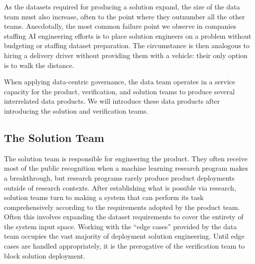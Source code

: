 As the datasets required for producing a solution expand, the size of the data team must also increase, often to the point where they outnumber all the other teams. Anecdotally, the most common failure point we observe in companies staffing AI engineering efforts is to place solution engineers on a problem without budgeting or staffing dataset preparation. The circumstance is then analogous to hiring a delivery driver without providing them with a vehicle: their only option is to walk the distance.

When applying data-centric governance, the data team operates in a service capacity for the product, verification, and solution teams to produce several interrelated data products. We will introduce these data products after introducing the solution and verification teams.

\subsection{The Solution Team}


%
%

The solution team is responsible for engineering the product. They often receive most of the public recognition when a machine learning research program makes a breakthrough, but research programs rarely produce product deployments outside of research contexts. After establishing what is possible via research, solution teams turn to making a system that can perform its task comprehensively according to the requirements adopted by the product team. Often this involves expanding the dataset requirements to cover the entirety of the system input space. Working with the ``edge cases'' provided by the data team occupies the vast majority of deployment solution engineering. Until edge cases are handled appropriately, it is the prerogative of the verification team to block solution deployment.


